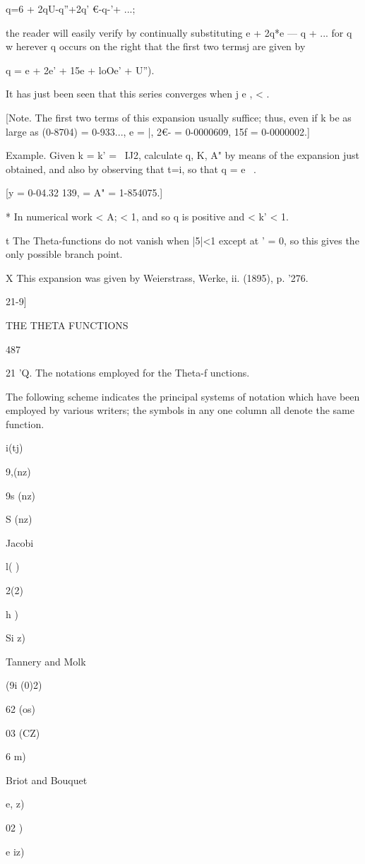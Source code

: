 q=6 + 2qU-q''+2q' €-q-'+ ...;

the reader will easily verify by continually substituting e + 2q*e — q
+ ... for q w herever q occurs on the right that the first two termsj
are given by

q = e + 2e' + 15e + loOe' + U'').

It has just been seen that this series converges when j e , < .

[Note. The first two terms of this expansion usually suffice; thus,
even if k be as large as (0-8704) = 0-933..., e = |, 2€- = 0-0000609,
15f = 0-0000002.]

Example. Given k = k' = \ IJ2, calculate q, K, A" by means of the
expansion just obtained, and also by observing that t=i, so that q =
e~ .

[y = 0-04.32 139, = A" = 1-854075.]

* In numerical work < A; < 1, and so q is positive and < k' < 1.

t The Theta-functions do not vanish when |5|<1 except at ' = 0, so
this gives the only possible branch point.

X This expansion was given by Weierstrass, Werke, ii. (1895), p. '276.

21-9]

THE THETA FUNCTIONS

487

21 'Q. The notations employed for the Theta-f unctions.

The following scheme indicates the principal systems of notation which
have been employed by various writers; the symbols in any one column
all denote the same function.

 i(tj)

9,(nz)

9s (nz)

S (nz)

Jacobi

 l( )

 2(2)

h )

Si z)

Tannery and Molk

(9i (0)2)

62 (os)

03 (CZ)

6 m)

Briot and Bouquet

e, z)

02 )

e iz)


